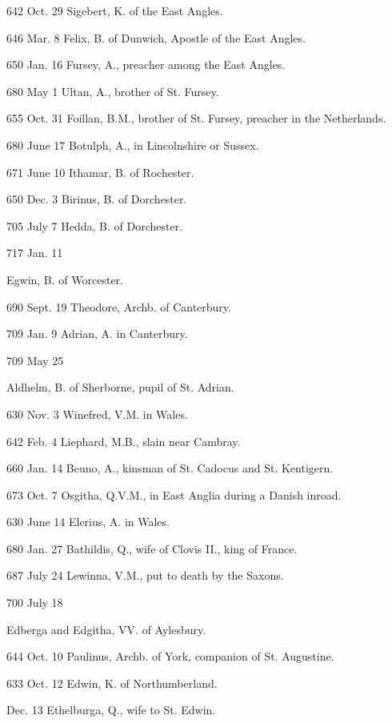 
642 Oct.
29
Sigebert,
K. of the East Angles.

646 Mar.
8
Felix, B. of Dunwich, Apostle of the East Angles.

650 Jan.
16
Fursey, A., preacher among the East Angles.

680 May
1
Ultan, A., brother of St. Fursey.

655 Oct.
31
Foillan, B.M., brother of St. Fursey, preacher in the
Netherlands.

680 June
17
Botulph, A., in Lincolnshire or Sussex.

671 June
10
Ithamar, B. of Rochester.

650 Dec.
3
Birinus, B. of Dorchester.

705 July
7
Hedda, B. of Dorchester.

717 Jan.
11

Egwin, B. of Worcester.


690 Sept. 19
Theodore, Archb.
of Canterbury.

709 Jan. 9
Adrian, A. in Canterbury.

709 May 25

Aldhelm, B. of Sherborne, pupil of St. Adrian.


630 Nov.
3
Winefred,
V.M. in Wales.

642 Feb.
4
Liephard, M.B., slain near Cambray.

660 Jan.
14
Beuno, A., kinsman of St. Cadocus and St. Kentigern.

673 Oct.
7
Osgitha, Q.V.M., in East Anglia during a Danish inroad.

630 June
14
Elerius, A. in Wales.

680 Jan.
27
Bathildis, Q., wife of Clovis II., king of France.

687 July
24
Lewinna, V.M., put to death by the Saxons.

700 July
18

Edberga and Edgitha, VV. of Aylesbury.


644 Oct.
10
Paulinus,
Archb. of York, companion of St. Augustine.

633 Oct.
12
Edwin, K. of Northumberland.

Dec. 13
Ethelburga,
Q., wife to St. Edwin.

